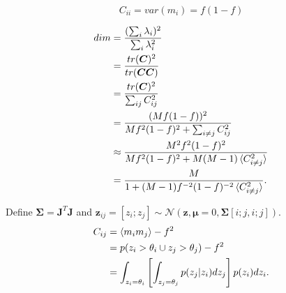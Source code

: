\documentclass{article}
\renewcommand\b\bm
\begin{document}
\begin{equation}
    C_{ii} = var(m_i) = f (1-f)
\end{equation}

\begin{align}
    dim &= \frac{(\sum_i \lambda_i)^2}{\sum_i \lambda_i^2}\\
    &= \frac{tr(\b{C})^2}{tr(\b{C} \b{C})}\\
    &= \frac{tr(\b{C})^2}{\sum_{ij}C_{ij}^2}\\
    &= \frac{(M f (1-f))^2}{M f^2 (1-f)^2 + \sum_{i \neq j} C_{ij}^2}\\
    &\approx \frac{M^2 f^2 (1-f)^2}{M f^2 (1-f)^2 + M (M-1) \braket{C_{i \neq j}^2}}\\
    &= \frac{M}{1 + (M-1)f^{-2}(1-f)^{-2}\braket{C_{i \neq j}^2}}.
\end{align}

Define $\b{\Sigma} = \b{J}^T \b{J}$ and $\b{z}_{ij} = [z_i; z_j] \sim \mathcal{N}(\b{z}, \b{\mu} = 0, \b{\Sigma}[i;j, i;j] ) $.
\begin{align}
    C_{ij} &= \braket{m_i m_j} - f^2\\
    &= p(z_i > \theta_i \cup  z_j > \theta_j) - f^2\\
    &= \int_{z_i = \theta_i} \left [ \int_{z_j = \theta_j} p(z_j| z_i) dz_j \right ] p(z_i) dz_i.
\end{align}
\end{document}
